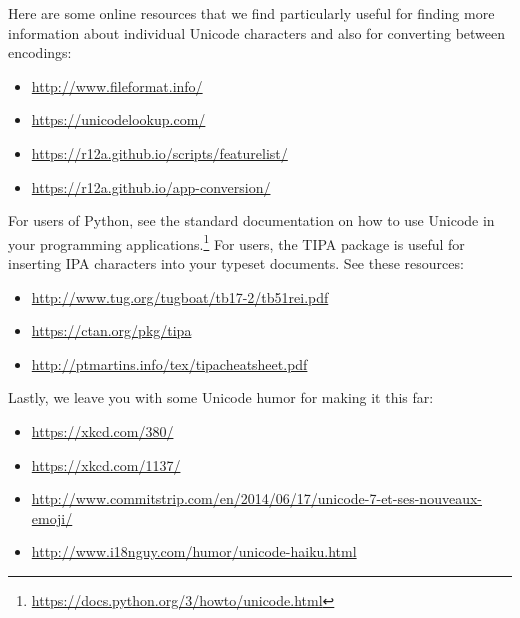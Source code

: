 Here are some online resources that we find particularly useful for finding more information about individual Unicode characters and also for converting between encodings:

\begin{itemize}
	\item \url{http://www.fileformat.info/}
	\item \url{https://unicodelookup.com/}
	\item \url{https://r12a.github.io/scripts/featurelist/}
	\item \url{https://r12a.github.io/app-conversion/}
\end{itemize}

For users of Python, see the standard documentation on how to use Unicode in your programming applications.\footnote{\url{https://docs.python.org/3/howto/unicode.html}} For \latex users, the TIPA package is useful for inserting IPA characters into your typeset documents. See these resources:

\begin{itemize}
	\item \url{http://www.tug.org/tugboat/tb17-2/tb51rei.pdf}
	\item \url{https://ctan.org/pkg/tipa}
	\item \url{http://ptmartins.info/tex/tipacheatsheet.pdf}
\end{itemize}	

Lastly, we leave you with some Unicode humor for making it this far:

\begin{itemize}
	\item \url{https://xkcd.com/380/}
	\item \url{https://xkcd.com/1137/}
	\item \url{http://www.commitstrip.com/en/2014/06/17/unicode-7-et-ses-nouveaux-emoji/}
	\item \url{http://www.i18nguy.com/humor/unicode-haiku.html}
\end{itemize}



